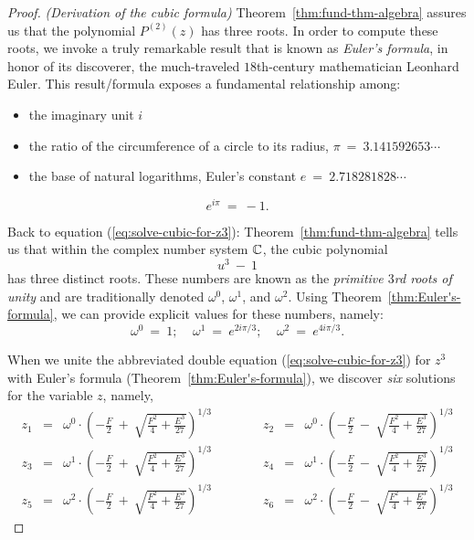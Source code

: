 \begin{proof} {\it (Derivation of the cubic formula)}
Theorem~\ref{thm:fund-thm-algebra} assures us that the polynomial
$P^{(2)}(z)$ has three roots.  In order to compute these roots, we
invoke a truly remarkable result that is known as  {\it Euler's formula}, in honor of its discoverer, the
much-traveled $18$th-century mathematician Leonhard
Euler.  This result/formula exposes a
fundamental relationship among:
\begin{itemize}
\item
the imaginary unit  $i$
\item
the ratio of the circumference of a circle to its radius,
$\pi \ = \ 3.141592653 \cdots$
\item
the base of natural logarithms, Euler's constant $e \ = \ 2.718281828 \cdots$
\end{itemize}

\begin{theorem}
\label{thm:Euler's-formula}
\[ e^{i \pi} \ = \ -1. \]
\end{theorem}

Back to equation (\ref{eq:solve-cubic-for-z3}):
Theorem~\ref{thm:fund-thm-algebra} tells us that within the complex
number system $\mathbb{C}$, the cubic polynomial
\[ u^3 \ - \ 1 \]
has three distinct roots.  These numbers are known as the {\em
  primitive $3$rd roots of unity}  and are traditionally denoted $\omega^0$, $\omega^1$, and
$\omega^2$.  Using Theorem~\ref{thm:Euler's-formula}, we can provide
explicit values for these numbers, namely:
\[ \omega^0 \ = \ 1; \ \ \ \ \
\omega^1 \ = \ e^{2i \pi/3}; \ \ \ \ \
\omega^2 \ = \ e^{4i \pi/3}.
\]

\medskip
When we unite the abbreviated double equation
(\ref{eq:solve-cubic-for-z3}) for $z^3$ with Euler's formula
(Theorem~\ref{thm:Euler's-formula}), we discover {\em six} solutions
for the variable $z$, namely, {\small
\begin{equation}
\label{eq:cubic-solution-1}
\begin{array}{ccrrrrrccr}
z_1 & = &
{\displaystyle
\omega^0 \cdot
\left( -\frac{F}{2} \ + \ \sqrt{\frac{F^2}{4} + \frac{E^3}{27}}
\right)^{1/3} 
}
  & & & & &
z_2 & = &
{\displaystyle
\omega^0 \cdot
\left( -\frac{F}{2} \ - \ \sqrt{\frac{F^2}{4} + \frac{E^3}{27}}
\right)^{1/3}
} \\
z_3 & = &
{\displaystyle
\omega^1 \cdot
\left( -\frac{F}{2} \ + \ \sqrt{\frac{F^2}{4} + \frac{E^3}{27}}
\right)^{1/3}
}
  & & & & & 
z_4 & = &
{\displaystyle
\omega^1 \cdot
\left( -\frac{F}{2} \ - \ \sqrt{\frac{F^2}{4} + \frac{E^3}{27}}
\right)^{1/3}
} \\
z_5 & = &
{\displaystyle
\omega^2 \cdot
\left( -\frac{F}{2} \ + \ \sqrt{\frac{F^2}{4} + \frac{E^3}{27}}
\right)^{1/3}
}
  & & & & &
z_6 & = &
{\displaystyle
\omega^2 \cdot
\left( -\frac{F}{2} \ - \ \sqrt{\frac{F^2}{4} + \frac{E^3}{27}}
\right)^{1/3}
}
\end{array}
\end{equation}
}


\end{proof}

